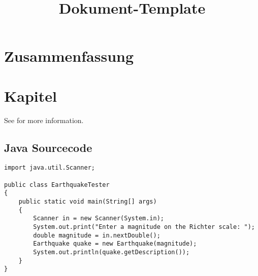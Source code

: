 \documentclass[bibtotoc,halfparskip,oneside]{scrreprt}
\begin{document}
\title{Dokument-Template}
\maketitle

\begin{versionhistory}
\end{versionhistory}

\chapter*{Zusammenfassung}

\lipsum[1-3]


\tableofcontents

\chapter{Kapitel}

\lipsum[1] See \cite{HS11,JCJ05,SH10} for more information.

\section{Java Sourcecode}

\lipsum[1-3]

\begin{lstlisting}[style=javastyle,caption={Beispiel von Java Sourcecode}]
import java.util.Scanner;
 
public class EarthquakeTester
{  
	public static void main(String[] args)
	{  
		Scanner in = new Scanner(System.in);
		System.out.print("Enter a magnitude on the Richter scale: "); 
		double magnitude = in.nextDouble();
		Earthquake quake = new Earthquake(magnitude);
		System.out.println(quake.getDescription());
	}
}
\end{lstlisting}
\end{document}
